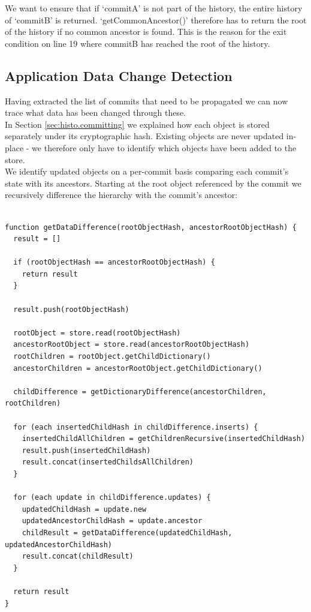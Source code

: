 We want to ensure that if `commitA' is not part of the history, the entire history of `commitB' is returned.
`getCommonAncestor()' therefore has to return the root of the history if no common ancestor is found.
This is the reason for the exit condition on line 19 where commitB has reached the root of the history.

\subsection{Application Data Change Detection}

Having extracted the list of commits that need to be propagated we can now trace what data has been changed through these.\\
In Section \ref{sec:histo.committing} we explained how each object is stored separately under its cryptographic hash.
Existing objects are never updated in-place - we therefore only have to identify which objects have been added to the store.\\

We identify updated objects on a per-commit basis comparing each commit's state with its ancestors.
Starting at the root object referenced by the commit we recursively difference the hierarchy with the commit's ancestor:

\begin{lstlisting}[caption=Detecting data difference across commits, label=data-difference]

function getDataDifference(rootObjectHash, ancestorRootObjectHash) {
  result = []

  if (rootObjectHash == ancestorRootObjectHash) {
    return result
  }

  result.push(rootObjectHash)

  rootObject = store.read(rootObjectHash)
  ancestorRootObject = store.read(ancestorRootObjectHash)
  rootChildren = rootObject.getChildDictionary()
  ancestorChildren = ancestorRootObject.getChildDictionary()

  childDifference = getDictionaryDifference(ancestorChildren, rootChildren)

  for (each insertedChildHash in childDifference.inserts) {
    insertedChildAllChildren = getChildrenRecursive(insertedChildHash)
    result.push(insertedChildHash)
    result.concat(insertedChildsAllChildren)
  }

  for (each update in childDifference.updates) {
    updatedChildHash = update.new
    updatedAncestorChildHash = update.ancestor
    childResult = getDataDifference(updatedChildHash, updatedAncestorChildHash)
    result.concat(childResult)
  }

  return result
}

\end{lstlisting}

